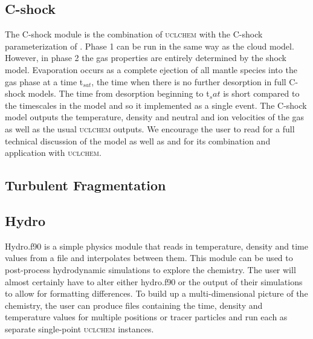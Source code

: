 \documentclass{llncs}
\begin{document}
\subsection{C-shock}
The C-shock module is the combination of \textsc{uclchem} with the C-shock parameterization of \citet{jimenez2008}. Phase 1 can be run in the same way as the cloud model. However, in phase 2 the gas properties are entirely determined by the shock model. Evaporation occurs as a complete ejection of all mantle species into the gas phase at a time t$_{sat}$, the time when there is no further desorption in full C-shock models. The time from desorption beginning to t$_sat$ is short compared to the timescales in the model and so it implemented as a single event. The C-shock model outputs the temperature, density and neutral and ion velocities of the gas as well as the usual \textsc{uclchem} outputs. We encourage the user to read \citet{jimenez2008} for a full technical discussion of the model as well as \citet{viti2011} and \citet{Holdship2016b} for its combination and application with \textsc{uclchem}. 
%
\subsection{Turbulent Fragmentation}

%
\subsection{Hydro}
Hydro.f90 is a simple physics module that reads in temperature, density and time values from a file and interpolates between them. This module can be used to post-process hydrodynamic simulations to explore the chemistry. The user will almost certainly have to alter either hydro.f90 or the output of their simulations to allow for formatting differences. To build up a multi-dimensional picture of the chemistry, the user can produce files containing the time, density and temperature values for multiple positions or tracer particles and run each as separate single-point \textsc{\textsc{uclchem}} instances.
\end{document}
